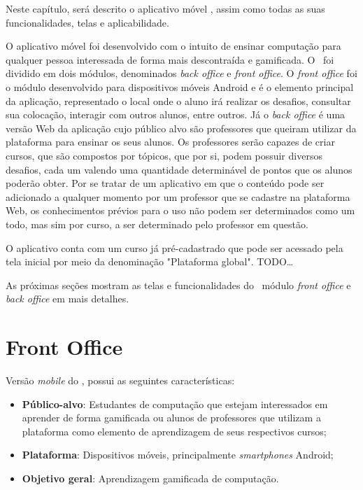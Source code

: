 Neste capítulo, será descrito o aplicativo móvel \appName, assim como todas as suas funcionalidades, telas e aplicabilidade.

O aplicativo móvel foi desenvolvido com o intuito de ensinar computação para qualquer pessoa interessada de forma mais descontraída e gamificada. O \appName\ foi dividido em dois módulos, denominados \textit{back office} e \textit{front office}. O \textit{front office} foi o módulo desenvolvido para dispositivos móveis Android e é o elemento principal da aplicação, representado o local onde o aluno irá realizar os desafios, consultar sua colocação, interagir com outros alunos, entre outros. Já o \textit{back office} é uma versão Web da aplicação cujo público alvo são professores que queiram utilizar da plataforma para ensinar os seus alunos. Os professores serão capazes de criar cursos, que são compostos por tópicos, que por si, podem possuir diversos desafios, cada um valendo uma quantidade determinável de pontos que os alunos poderão obter. Por se tratar de um aplicativo em que o conteúdo pode ser adicionado a qualquer momento por um professor que se cadastre na plataforma Web, os conhecimentos prévios para o uso não podem ser determinados como um todo, mas sim por curso, a ser determinado pelo professor em questão.

O aplicativo conta com um curso já pré-cadastrado que pode ser acessado pela tela inicial por meio da denominação "Plataforma global". TODO\dots

As próximas seções mostram as telas e funcionalidades do \appName\, módulo \textit{front office} e \textit{back office} em mais detalhes.

\section{Front Office}

Versão \textit{mobile} do \appName, possui as seguintes características:

\begin{itemize}
    \item \textbf{Público-alvo}: Estudantes de computação que estejam interessados em aprender de forma gamificada ou alunos de professores que utilizam a plataforma como elemento de aprendizagem de seus respectivos cursos;
    \item \textbf{Plataforma}: Dispositivos móveis, principalmente \textit{smartphones} Android;
    \item \textbf{Objetivo geral}: Aprendizagem gamificada de computação.
\end{itemize}


